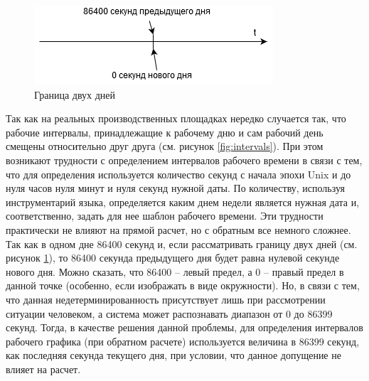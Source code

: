 \begin{figure}[h!]
	\centering
	\includegraphics[width=0.6\linewidth]{pics/scheduleTime.png}
	\caption{Граница двух дней}
	\label{fig:time}
\end{figure}

\indent Так как на реальных производственных площадках нередко случается так, что рабочие интервалы, принадлежащие к рабочему дню и сам рабочий день смещены относительно друг друга (см. рисунок \ref{fig:intervals}).
При этом возникают трудности с определением интервалов рабочего времени в связи с тем, что для определения используется количество секунд с начала эпохи Unix и до нуля часов нуля минут и нуля секунд нужной даты.
По количеству, используя инструментарий языка, определяется каким днем недели является нужная дата и, соответственно, задать для нее шаблон рабочего времени.
Эти трудности практически не влияют на прямой расчет, но с обратным все немного сложнее.
Так как в одном дне 86400 секунд и, если рассматривать границу двух дней (см. рисунок \ref{fig:time}), то 86400 секунда предыдущего дня будет равна нулевой секунде нового дня.
Можно сказать, что 86400 -- левый предел, а 0 -- правый предел в данной точке (особенно, если изображать в виде окружности).
Но, в связи с тем, что данная недетерминированность присутствует лишь при рассмотрении ситуации человеком, а система может распознавать диапазон от 0 до 86399 секунд.
Тогда, в качестве решения данной проблемы, для определения интервалов рабочего графика (при обратном расчете) используется величина в 86399 секунд, как последняя секунда текущего дня, при условии, что данное допущение не влияет на расчет.


